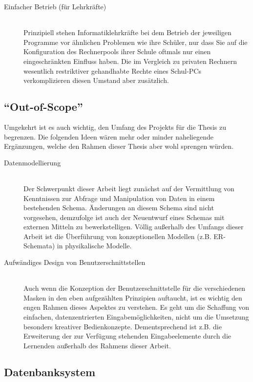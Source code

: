 \documentclass[paper=a4,fontsize=11pt,parskip=half]{scrartcl}
\begin{document}
\begin{description}
\item[Einfacher Betrieb (für Lehrkräfte)] \hfill \\
  Prinzipiell stehen Informatiklehrkräfte bei dem Betrieb der jeweiligen Programme vor ähnlichen Problemen wie ihre Schüler, nur dass Sie auf die Konfiguration des Rechnerpools ihrer Schule oftmals nur einen eingeschränkten Einfluss haben. Die im Vergleich zu privaten Rechnern wesentlich restriktiver gehandhabte Rechte eines Schul-PCs verkomplizieren diesen Umstand aber zusätzlich.
  
\end{description}

\subsection{``Out-of-Scope''}

Umgekehrt ist es auch wichtig, den Umfang des Projekts für die Thesis zu begrenzen. Die folgenden Ideen wären mehr oder minder naheliegende Ergänzungen, welche den Rahmen dieser Thesis aber wohl sprengen würden.

\begin{description}
\item[Datenmodellierung] \hfill \\
  Der Schwerpunkt dieser Arbeit liegt zunächst auf der Vermittlung von Kenntnissen zur Abfrage und Manipulation von Daten in einem bestehenden Schema. Änderungen an diesem Schema sind nicht vorgesehen, demzufolge ist auch der Neuentwurf eines Schemas mit externen Mitteln zu bewerkstelligen. Völlig außerhalb des Umfangs dieser Arbeit ist die Überführung von konzeptionellen Modellen (z.B. ER-Schemata) in physikalische Modelle.
\item[Aufwändiges Design von Benutzerschnittstellen] \hfill \\
  Auch wenn die Konzeption der Benutzerschnittstelle für die verschiedenen Masken in den eben aufgezählten Prinzipien auftaucht, ist es wichtig den engen Rahmen dieses Aspektes zu verstehen. Es geht um die Schaffung von einfachen, datenzentrierten Eingabemöglichkeiten, nicht um die Umsetzung besonders kreativer Bedienkonzepte. Dementsprechend ist z.B. die Erweiterung der zur Verfügung stehenden Eingabeelemente durch die Lernenden außerhalb des Rahmens dieser Arbeit.
\end{description}

\subsection{Datenbanksystem}
\end{document}
